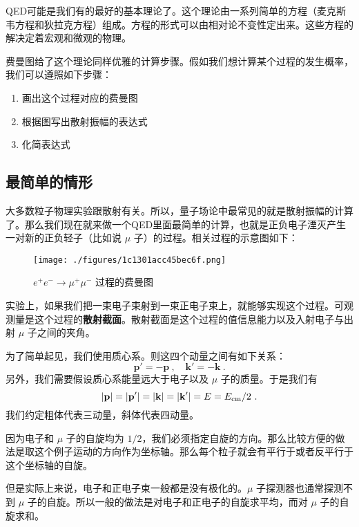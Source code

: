 

QED可能是我们有的最好的基本理论了。这个理论由一系列简单的方程（麦克斯韦方程和狄拉克方程）组成。方程的形式可以由相对论不变性定出来。这些方程的解决定着宏观和微观的物理。

费曼图给了这个理论同样优雅的计算步骤。假如我们想计算某个过程的发生概率，我们可以遵照如下步骤：

\begin{enumerate}
\item 画出这个过程对应的费曼图
\item 根据图写出散射振幅的表达式
\item 化简表达式
\end{enumerate}

\subsection{最简单的情形}
大多数粒子物理实验跟散射有关。所以，量子场论中最常见的就是散射振幅的计算了。那么我们现在就来做一个QED里面最简单的计算，也就是正负电子湮灭产生一对新的正负轻子（比如说 $\mu$ 子）的过程。相关过程的示意图如下：

\begin{figure}[ht]
\centering
\texttt{[image: ./figures/1c1301acc45bec6f.png]}
\caption{$e^+e^-\rightarrow\mu^+\mu^-$ 过程的费曼图} \label{fig_QFT0_1}
\end{figure}

实验上，如果我们把一束电子束射到一束正电子束上，就能够实现这个过程。可观测量是这个过程的\textbf{散射截面}。散射截面是这个过程的值信息能力以及入射电子与出射 $\mu$ 子之间的夹角。

为了简单起见，我们使用质心系。则这四个动量之间有如下关系：
\begin{equation}
\mathbf p' = - \mathbf p~, \quad \mathbf k'=-\mathbf k~.
\end{equation}
另外，我们需要假设质心系能量远大于电子以及 $\mu$ 子的质量。于是我们有
\begin{equation}
|\mathbf p| = |\mathbf p'| = |\mathbf k| = |\mathbf k'| = E = E_{\rm cm}/2~.
\end{equation}
我们约定粗体代表三动量，斜体代表四动量。

因为电子和 $\mu$ 子的自旋均为 $1/2$，我们必须指定自旋的方向。那么比较方便的做法是取这个例子运动的方向作为坐标轴。那么每个粒子就会有平行于或者反平行于这个坐标轴的自旋。

但是实际上来说，电子和正电子束一般都是没有极化的。$\mu$ 子探测器也通常探测不到 $\mu$ 子的自旋。所以一般的做法是对电子和正电子的自旋求平均，而对 $\mu$ 子的自旋求和。

